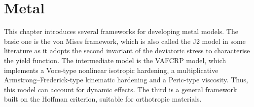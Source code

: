 \chapter{Metal}
This chapter introduces several frameworks for developing metal models.
The basic one is the von Mises framework, which is also called the J2 model in some literature as it adopts the second invariant of the deviatoric stress to characterise the yield function.
The intermediate model is the VAFCRP model, which implements a Voce-type nonlinear isotropic hardening, a multiplicative Armstrong--Frederick-type kinematic hardening and a Peric-type viscosity.
Thus, this model can account for dynamic effects.
The third is a general framework built on the Hoffman criterion, suitable for orthotropic materials.




